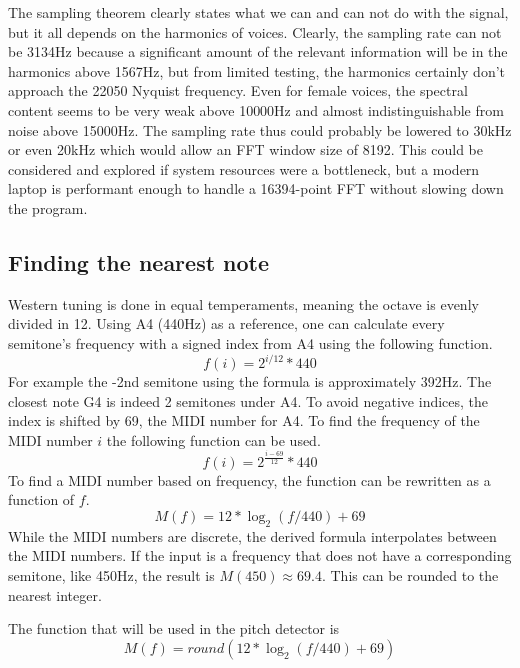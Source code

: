 The sampling theorem clearly states what we can and can not do with the signal, but it all depends on the harmonics of voices. Clearly, the sampling rate can not be 3134Hz because a significant amount of the relevant information will be in the harmonics above 1567Hz, but from limited testing, the harmonics certainly don't approach the 22050 Nyquist frequency. Even for female voices, the spectral content seems to be very weak above 10000Hz and almost indistinguishable from noise above 15000Hz. The sampling rate thus could probably be lowered to 30kHz or even 20kHz which would allow an FFT window size of 8192. This could be considered and explored if system resources were a bottleneck, but a modern laptop is performant enough to handle a 16394-point FFT without slowing down the program.

\subsection{Finding the nearest note}
Western tuning is done in equal temperaments, meaning the octave is evenly divided in 12. Using A4 (440Hz) as a reference, one can calculate every semitone's frequency with a signed index from A4 using the following function. 
$$f(i) = 2^{i/12}*440$$
For example the -2nd semitone using the formula is approximately 392Hz. The closest note G4 is indeed 2 semitones under A4. To avoid negative indices, the index is shifted by 69, the MIDI number for A4. To find the frequency of the MIDI number $i$ the following function can be used.
$$f(i) = 2^{\frac{i-69}{12}}*440$$
To find a MIDI number based on frequency, the function can be rewritten as a function of $f$.
$$M(f) = 12*\log_2(f/440)+69$$
While the MIDI numbers are discrete, the derived formula interpolates between the MIDI numbers. If the input is a frequency that does not have a corresponding semitone, like 450Hz, the result is $M(450) \approx 69.4$. This can be rounded to the nearest integer.

The function that will be used in the pitch detector is
$$M(f) = round(12*\log_2(f/440)+69)$$

